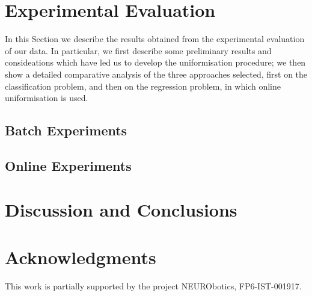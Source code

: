 \documentclass[journal]{IEEEtran}
\begin{document}
\section{Experimental Evaluation}
\label{sec:exp}

In this Section we describe the results obtained from the experimental
evaluation of our data. In particular, we first describe some
preliminary results and consideations which have led us to develop the
uniformisation procedure; we then show a detailed comparative analysis
of the three approaches selected, first on the classification problem,
and then on the regression problem, in which online uniformisation is
used.

\subsection{Batch Experiments}
\label{subsec:strategy}


\subsection{Online Experiments}
\label{subsec:online}


\section{Discussion and Conclusions}
\label{sec:discussion}


\section*{Acknowledgments}

This work is partially supported by the project NEURObotics,
FP6-IST-001917.

{\small


}


\end{document}
